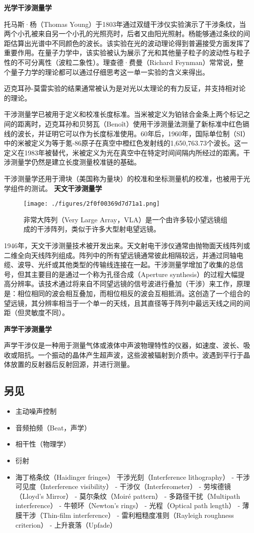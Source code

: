 \textbf{光学干涉测量学}

托马斯·杨（Thomas Young）于1803年通过双缝干涉仪实验演示了干涉条纹，当两个小孔被来自另一个小孔的光照亮时，后者又由阳光照射。杨能够通过条纹的间距估算出光谱中不同颜色的波长。该实验在光的波动理论得到普遍接受方面发挥了重要作用。在量子力学中，该实验被认为展示了光和其他量子粒子的波动性与粒子性的不可分离性（波粒二象性）。理查德·费曼（Richard Feynman）常常说，整个量子力学的理论都可以通过仔细思考这一单一实验的含义来得出。

迈克耳孙-莫雷实验的结果通常被认为是对光以太理论的有力反证，并支持相对论的理论。

干涉测量学已被用于定义和校准长度标准。当米被定义为铂铱合金条上两个标记之间的距离时，迈克耳孙和贝努瓦（Benoît）使用干涉测量法测量了新标准中红色镉线的波长，并证明它可以作为长度标准使用。60年后，1960年，国际单位制（SI）中的米被定义为等于氪-86原子在真空中橙红色发射线的1,650,763.73个波长。这一定义在1983年被替代，米被定义为光在真空中在特定时间间隔内所经过的距离。干涉测量学仍然是建立长度测量校准链的基础。

干涉测量学还用于滑块（美国称为量块）的校准和坐标测量机的校准，也被用于光学组件的测试。
\textbf{天文干涉测量学}
\begin{figure}[ht]
\centering
\texttt{[image: ./figures/2f0f00369d7d71a1.png]}
\caption{非常大阵列（Very Large Array，VLA）是一个由许多较小望远镜组成的干涉阵列，类似于许多大型射电望远镜。} \label{fig_GSWLX_11}
\end{figure}
1946年，天文干涉测量技术被开发出来。天文射电干涉仪通常由抛物面天线阵列或二维全向天线阵列组成。阵列中的所有望远镜通常彼此相隔较远，并通过同轴电缆、波导、光纤或其他类型的传输线连接在一起。干涉测量学增加了收集的总信号，但其主要目的是通过一个称为孔径合成（Aperture synthesis）的过程大幅提高分辨率。该技术通过将来自不同望远镜的信号波进行叠加（干涉）来工作，原理是：相位相同的波会相互叠加，而相位相反的波会互相抵消。这创造了一个组合的望远镜，其分辨率相当于一个单一的天线，且其直径等于阵列中最远天线之间的间距（但灵敏度不同）。

\textbf{声学干涉测量学}

声学干涉仪是一种用于测量气体或液体中声波物理特性的仪器，如速度、波长、吸收或阻抗。一个振动的晶体产生超声波，这些波被辐射到介质中。波遇到平行于晶体放置的反射器后反射回源，并进行测量。
\subsection{另见}
\begin{itemize}
\item 主动噪声控制
\item 音频拍频（Beat，声学）
\item 相干性（物理学）
\item 衍射
\item 海丁格条纹（Haidinger fringes）
干涉光刻（Interference lithography）
- 干涉可见度（Interference visibility）
- 干涉仪（Interferometer）
- 劳埃德镜（Lloyd's Mirror）
- 莫尔条纹（Moiré pattern）
- 多路径干扰（Multipath interference）
- 牛顿环（Newton's rings）
- 光程（Optical path length）
- 薄膜干涉（Thin-film interference）
- 雷利粗糙度准则（Rayleigh roughness criterion）
- 上升衰落（Upfade）
\end{itemize}